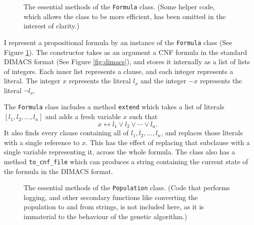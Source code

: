 \documentclass[proof,pdftex,11pt,a4,titlepage]{article}
\def\code{\lstinline[basicstyle=\textsize\ttfamily]}
\begin{document}
\begin{figure}[p]
  
  \caption{The essential methods of the \code{Formula} class. (Some helper code, which allows the class to be more efficient, has been omitted in the interest of clarity.)}
  \label{fig:formula-class}
\end{figure}

I represent a propositional formula by an instance of the \code{Formula} class (See Figure \ref{fig:formula-class}). The constructor takes as an argument a CNF formula in the standard DIMACS format (See Figure \ref{fig:dimacs}), and stores it internally as a list of lists of integers. Each inner list represents a clause, and each integer represents a literal. The integer $x$ represents the literal $l_x$ and the integer $-x$ represents the literal $\neg l_x$.

The \code{Formula} class includes a method \code{extend} which takes a list of literals $[l_1, l_2, \ldots, l_n]$ and adds a fresh variable $x$ such that
\[x \leftrightarrow l_1 \vee l_2 \vee \cdots \vee l_n.\]
It also finds every clause containing all of $l_1, l_2, \ldots, l_n$, and replaces those literals with a single reference to $x$. This has the effect of replacing that subclause with a single variable representing it, across the whole formula. The class also has a method \code{to_cnf_file} which can produces a string containing the current state of the formula in the DIMACS format.

\begin{figure}[p]
  
  \caption{The essential methods of the \code{Population} class. (Code that performs logging, and other secondary functions like converting the population to and from strings, is not included here, as it is immaterial to the behaviour of the genetic algorithm.)}
  \label{fig:population-class}
\end{figure}
\end{document}
